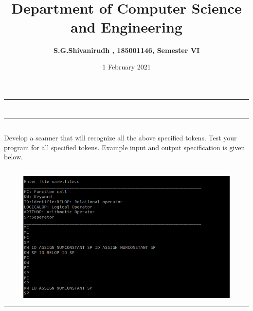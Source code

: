 \documentclass[12pt,letterpaper]{article}
\title{\textbf{Department of Computer Science and Engineering}}
\author{\textbf{S.G.Shivanirudh , 185001146, Semester VI }}
\date{1 February 2021}
\begin{document}
\maketitle
\hrule
\section*{}
\hrule 
\bigskip\bigskip

\subsection*{}

\subsection*{}
\begin{flushleft}
    Develop a scanner that will recognize all the above specified tokens. Test your program for all specified tokens. Example input and output specification is given below.    
\end{flushleft}

\subsection*{}
\begin{flushleft}

\end{flushleft}

\newpage
\subsection*{}
\begin{flushleft}
    
\end{flushleft}
\newpage
\subsection*{}
\begin{figure}[h]
    \centering
    \includegraphics[width = \textwidth]{OP.png}
\end{figure}
\hrule
\end{document}

